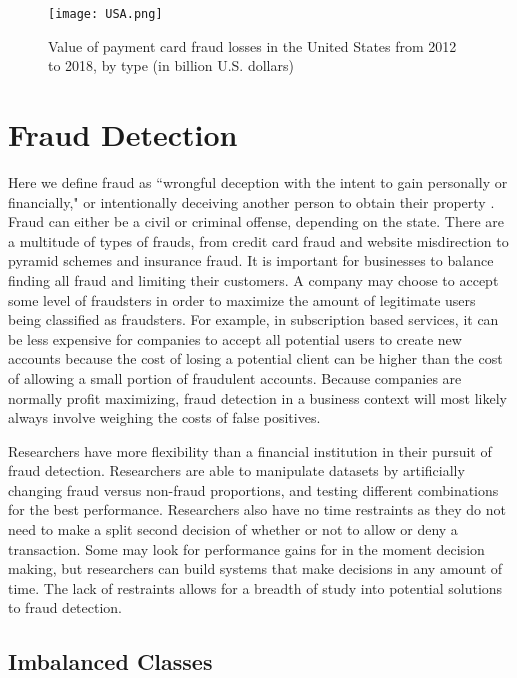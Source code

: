 \documentclass[midd]{thesis}
\begin{document}
\begin{figure}
  \texttt{[image: USA.png]}
  \caption{Value of payment card fraud losses in the United States from 2012 to 2018, by type (in billion U.S. dollars) \cite{USA}}
  \label{fig:USA}
\end{figure}


\pagebreak

\chapter{Fraud Detection}
\label{sec:background}

Here we define fraud as ``wrongful deception with the intent to gain personally or financially," or intentionally deceiving another person to obtain their property \cite{legaldict}. Fraud can either be a civil or criminal offense, depending on the state. There are a multitude of types of frauds, from credit card fraud and website misdirection to pyramid schemes and insurance fraud. It is important for businesses to balance finding all fraud and limiting their customers. A company may choose to accept some level of fraudsters in order to maximize the amount of legitimate users being classified as fraudsters. For example, in subscription based services, it can be less expensive for companies to accept all potential users to create new accounts because the cost of losing a potential client can be higher than the cost of allowing a small portion of fraudulent accounts. Because companies are normally profit maximizing, fraud detection in a business context will most likely always involve weighing the costs of false positives.

Researchers have more flexibility than a financial institution in their pursuit of fraud detection. Researchers are able to manipulate datasets by artificially changing fraud versus non-fraud proportions, and testing different combinations for the best performance. Researchers also have no time restraints as they do not need to make a split second decision of whether or not to allow or deny a transaction. Some may look for performance gains for in the moment decision making, but researchers can build systems that make decisions in any amount of time. The lack of restraints allows for a breadth of study into potential solutions to fraud detection. 

\section{Imbalanced Classes} %
\end{document}
